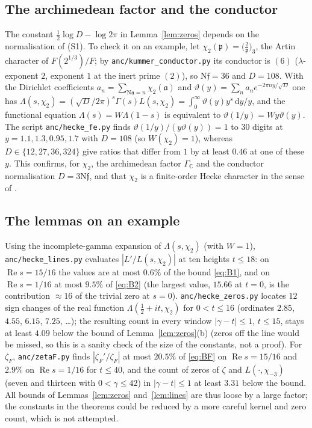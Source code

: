 \documentclass[11pt]{article}
\theoremstyle{definition}
\theoremstyle{remark}
\numberwithin{equation}{section}
\newcommand{\C}{\mathbb C}
\newcommand{\fa}{\mathfrak a}
\newcommand{\fp}{\mathfrak p}
\newcommand{\ff}{\mathfrak f}
\newcommand{\Nm}{\mathrm N}
\newcommand{\Rea}{\operatorname{Re}}
\newcommand{\dd}{\,\mathrm{d}}
\newcommand{\cubic}[2]{\bigl(\tfrac{#1}{#2}\bigr)_{3}}
\begin{document}
\subsection{The archimedean factor and the conductor}\label{sec:gamma}
The constant $\tfrac12\log D-\log2\pi$ in Lemma~\ref{lem:zeros} depends on the normalisation of (S1). To check it on an example, let $\chi_2(\fp)=\cubic{2}{\fp}$, the Artin character of $F(2^{1/3})/F$; by \texttt{anc/kummer\_conductor.py} its conductor is $(6)$ ($\lambda$-exponent $2$, exponent $1$ at the inert prime $(2)$), so $\Nm\ff=36$ and $D=108$. With the Dirichlet coefficients $a_n=\sum_{\Nm\fa=n}\chi_2(\fa)$ and $\vartheta(y)=\sum_na_ne^{-2\pi ny/\sqrt D}$ one has $\Lambda(s,\chi_2)=(\sqrt D/2\pi)^s\Gamma(s)L(s,\chi_2)=\int_0^\infty\vartheta(y)y^{s}\dd y/y$, and the functional equation $\Lambda(s)=W\Lambda(1-s)$ is equivalent to $\vartheta(1/y)=Wy\vartheta(y)$. The script \texttt{anc/hecke\_fe.py} finds $\vartheta(1/y)/(y\vartheta(y))=1$ to $30$ digits at $y=1.1,1.3,0.95,1.7$ with $D=108$ (so $W(\chi_2)=1$), whereas $D\in\{12,27,36,324\}$ give ratios that differ from $1$ by at least $0.46$ at one of these $y$. This confirms, for $\chi_2$, the archimedean factor $\Gamma_\C$ and the conductor normalisation $D=3\Nm\ff$, and that $\chi_2$ is a finite-order Hecke character in the sense of \cite{openai2026q}.

\subsection{The lemmas on an example}\label{sec:lemmas-numeric}
Using the incomplete-gamma expansion of $\Lambda(s,\chi_2)$ (with $W=1$), \texttt{anc/hecke\_lines.py} evaluates $|L'/L(s,\chi_2)|$ at ten heights $t\le18$: on $\Rea s=15/16$ the values are at most $0.6\%$ of the bound \eqref{eq:B1}, and on $\Rea s=1/16$ at most $9.5\%$ of \eqref{eq:B2} (the largest value, $15.66$ at $t=0$, is the contribution $\approx16$ of the trivial zero at $s=0$). \texttt{anc/hecke\_zeros.py} locates $12$ sign changes of the real function $\Lambda(\tfrac12+it,\chi_2)$ for $0<t\le16$ (ordinates $2.85$, $4.55$, $6.15$, $7.25$, \ldots); the resulting count in every window $|\gamma-t|\le1$, $t\le15$, stays at least $4.09$ below the bound of Lemma~\ref{lem:zeros}(b) (zeros off the line would be missed, so this is a sanity check of the size of the constants, not a proof). For $\zeta_F$, \texttt{anc/zetaF.py} finds $|\zeta_F'/\zeta_F|$ at most $20.5\%$ of \eqref{eq:BF} on $\Rea s=15/16$ and $2.9\%$ on $\Rea s=1/16$ for $t\le40$, and the count of zeros of $\zeta$ and $L(\cdot,\chi_{-3})$ (seven and thirteen with $0<\gamma\le42$) in $|\gamma-t|\le1$ at least $3.31$ below the bound. All bounds of Lemmas~\ref{lem:zeros} and~\ref{lem:lines} are thus loose by a large factor; the constants in the theorems could be reduced by a more careful kernel and zero count, which is not attempted.
\end{document}
